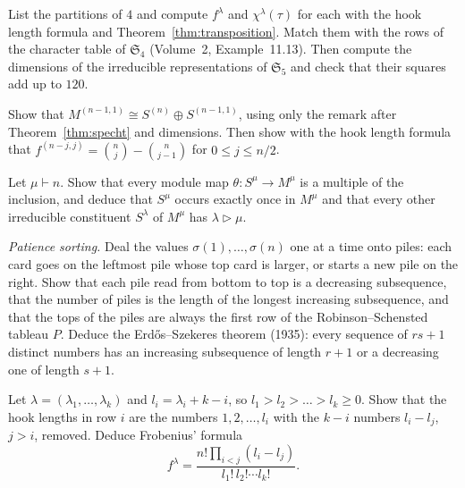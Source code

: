 \begin{exercise}[$\star$]\label{ex:smalltables}
List the partitions of $4$ and compute $f^\lambda$ and $\chi^\lambda(\tau)$ for each with the hook length formula and Theorem~\ref{thm:transposition}. Match them with the rows of the character table of $\mathfrak S_4$ (Volume~2, Example~11.13). Then compute
the dimensions of the irreducible representations of $\mathfrak S_5$ and check that their squares add up to $120$.
\end{exercise}

\begin{exercise}[$\star$]\label{ex:standardrep}
Show that $M^{(n-1,1)}\cong S^{(n)}\oplus S^{(n-1,1)}$, using only the remark after Theorem~\ref{thm:specht} and dimensions. Then show with the hook length formula that $f^{(n-j,j)}=\binom nj-\binom n{j-1}$ for $0\le j\le n/2$.
\end{exercise}

\begin{exercise}[$\star\star$]\label{ex:youngmult}
Let $\mu\vdash n$. Show that every module map $\theta:S^\mu\to M^\mu$ is a multiple of the inclusion, and deduce that $S^\mu$ occurs exactly once in $M^\mu$ and that every other irreducible constituent $S^\lambda$ of $M^\mu$ has $\lambda\triangleright\mu$.
\end{exercise}

\begin{exercise}[$\star\star$]\label{ex:patience}
\emph{Patience sorting.} Deal the values $\sigma(1),\dots,\sigma(n)$ one at a time onto piles: each card goes on the leftmost pile whose top card is larger, or starts a new pile on the right. Show that each pile read from bottom to top is a
decreasing subsequence, that the number of piles is the length of the longest increasing subsequence, and that the tops of the piles are always the first row of the Robinson--Schensted tableau $P$. Deduce the Erdős--Szekeres theorem (1935):
every sequence of $rs+1$ distinct numbers has an increasing subsequence of length $r+1$ or a decreasing one of length $s+1$.
\end{exercise}

\begin{exercise}[$\star\star\star$]\label{ex:frobeniusdim}
Let $\lambda=(\lambda_1,\dots,\lambda_k)$ and $l_i=\lambda_i+k-i$, so $l_1>l_2>\dots>l_k\ge0$. Show that the hook lengths in row $i$ are the numbers $1,2,\dots,l_i$ with the $k-i$ numbers $l_i-l_j$, $j>i$, removed. Deduce Frobenius' formula
\[
f^\lambda=\frac{n!\prod_{i<j}(l_i-l_j)}{l_1!\,l_2!\cdots l_k!}.
\]
\end{exercise}

